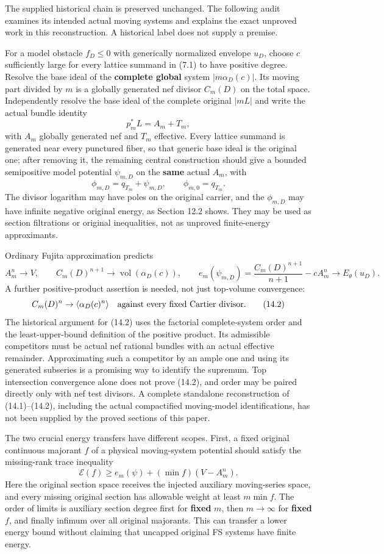 \documentclass[
  10pt,
]{article}
\begin{document}
The supplied historical chain is preserved unchanged. The following
audit examines its intended actual moving systems and explains the exact
unproved work in this reconstruction. A historical label does not supply
a premise.

For a model obstacle \(f_D\leq0\) with generically normalized envelope
\(u_D\), choose \(c\) sufficiently large for every lattice summand in
(7.1) to have positive degree. Resolve the base ideal of the
\textbf{complete global} system \(|m\alpha_D(c)|\). Its moving part
divided by \(m\) is a globally generated nef divisor \(C_m(D)\) on the
total space. Independently resolve the base ideal of the complete
original \(|mL|\) and write the actual bundle identity
\[p_m^*L=A_m+T_m,\] with \(A_m\) globally generated nef and \(T_m\)
effective. Every lattice summand is generated near every punctured
fiber, so that generic base ideal is the original one; after removing
it, the remaining central construction should give a bounded
semipositive model potential \(\psi_{m,D}\) on the \textbf{same} actual
\(A_m\), with \[\phi_{m,D}=q_{T_m}+\psi_{m,D},\qquad
\phi_{m,0}=q_{T_m}.\] The divisor logarithm may have poles on the
original carrier, and the \(\phi_{m,D}\) may have infinite negative
original energy, as Section 12.2 shows. They may be used as section
filtrations or original inequalities, not as unproved finite-energy
approximants.

Ordinary Fujita approximation predicts \[A_m^n\to V,\qquad
C_m(D)^{n+1}\to\operatorname{vol}(\alpha_D(c)),\qquad
e_m(\psi_{m,D})=\frac{C_m(D)^{n+1}}{n+1}-cA_m^n\to E_\theta(u_D).\tag{14.1}\]
A further positive-product assertion is needed, not just top-volume
convergence: \[C_m(D)^n\to\langle\alpha_D(c)^n\rangle
\quad\hbox{against every fixed Cartier divisor.}\tag{14.2}\] The
historical argument for (14.2) uses the factorial complete-system order
and the least-upper-bound definition of the positive product. Its
admissible competitors must be actual nef rational bundles with an
actual effective remainder. Approximating such a competitor by an ample
one and using its generated subseries is a promising way to identify the
supremum. Top intersection convergence alone does not prove (14.2), and
order may be paired directly only with nef test divisors. A complete
standalone reconstruction of (14.1)--(14.2), including the actual
compactified moving-model identifications, has not been supplied by the
proved sections of this paper.

The two crucial energy transfers have different scopes. First, a fixed
original continuous majorant \(f\) of a physical moving-system potential
should satisfy the missing-rank trace inequality
\[\mathscr E(f)\geq e_m(\psi)+(\min f)(V-A_m^n).\tag{14.3}\] Here the
original section space receives the injected auxiliary moving-series
space, and every missing original section has allowable weight at least
\(m\min f\). The order of limits is auxiliary section degree first for
\textbf{fixed} \(m\), then \(m\to\infty\) for \textbf{fixed} \(f\), and
finally infimum over all original majorants. This can transfer a lower
energy bound without claiming that uncapped original FS systems have
finite energy.
\end{document}

